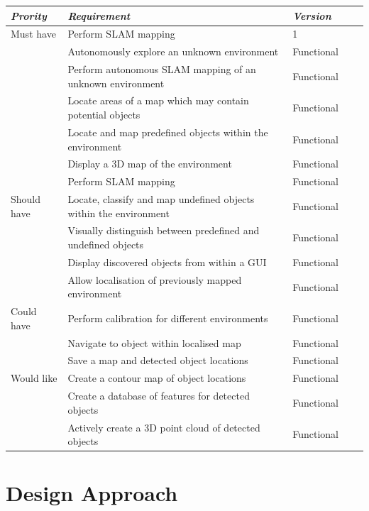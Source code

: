\documentclass{mproj}
\begin{document}
\begin{tabular}{*5l}    \toprule
\emph{Prority} & \emph{Requirement} & \emph{Version} \\\midrule
\rowcolor{green!50} Must have & Perform SLAM mapping & 1\\
\rowcolor{green!50} & Autonomously explore an unknown environment & Functional\\
\rowcolor{green!50} & Perform autonomous SLAM mapping of an unknown environment & Functional\\
\rowcolor{green!50} & Locate areas of a map which may contain potential objects & Functional\\
\rowcolor{green!50} & Locate and map predefined objects within the environment & Functional\\
\rowcolor{green!50} & Display a 3D map of the environment & Functional\\
\rowcolor{green!50} & Perform SLAM mapping & Functional\\
\rowcolor{yellow!50} Should have & Locate, classify and map undefined objects within the environment & Functional\\
\rowcolor{yellow!50} & Visually distinguish between predefined and undefined objects & Functional\\
\rowcolor{yellow!50} & Display discovered objects from within a GUI & Functional\\
\rowcolor{yellow!50} & Allow localisation of previously mapped environment  & Functional\\
\rowcolor{orange!50} Could have & Perform calibration for different environments  & Functional\\
\rowcolor{orange!50} & Navigate to object within localised map  & Functional\\
\rowcolor{orange!50} & Save a map and detected object locations  & Functional\\
\rowcolor{red!50} Would like & Create a contour map of object locations & Functional\\
\rowcolor{red!50} & Create a database of features for detected objects & Functional\\
\rowcolor{red!50} & Actively create a 3D point cloud of detected objects & Functional\\

\bottomrule
 \hline
\end{tabular}


\section{Design Approach}
\end{document}
